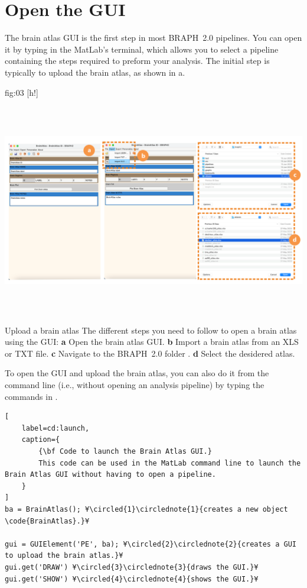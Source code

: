 \documentclass[justified]{tufte-handout}
\begin{document}
\clearpage
\section{Open the GUI}

The brain atlas GUI is the first step in most BRAPH~2.0 pipelines. You can open it by typing  in the MatLab's terminal, which allows you to select a pipeline containing the steps required to preform your analysis. The initial step is typically to upload the brain atlas, as shown in a.

	{fig:03}
	{
	[h!]
	\includegraphics[height=10cm]{fig03.png}
	}
	{Upload a brain atlas}
	{
	The different steps you need to follow to open a brain atlas using the GUI: 
	{\bf a} Open the brain atlas GUI.
	{\bf b} Import a brain atlas from an XLS or TXT file.
	{\bf c} Navigate to the BRAPH~2.0 folder .
	{\bf d} Select the desidered atlas.
	}

To open the GUI and upload the brain atlas, you can also do it from the command line (i.e., without opening an analysis pipeline) by typing the commands in .
%
\begin{lstlisting}[
	label=cd:launch,
	caption={
		{\bf Code to launch the Brain Atlas GUI.}
		This code can be used in the MatLab command line to launch the  Brain Atlas GUI without having to open a pipeline.
	}
]
ba = BrainAtlas(); ¥\circled{1}\circlednote{1}{creates a new object \code{BrainAtlas}.}¥

gui = GUIElement('PE', ba); ¥\circled{2}\circlednote{2}{creates a GUI to upload the brain atlas.}¥
gui.get('DRAW') ¥\circled{3}\circlednote{3}{draws the GUI.}¥
gui.get('SHOW') ¥\circled{4}\circlednote{4}{shows the GUI.}¥
\end{lstlisting}
\end{document}
